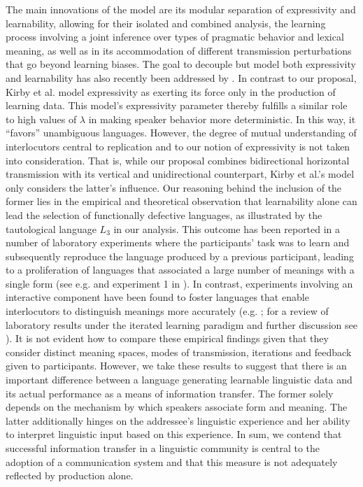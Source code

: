 \documentclass[a4paper]{article}
\begin{document}
The main innovations of the model are its modular separation of expressivity and learnability, allowing for their isolated and combined analysis, the learning process involving a joint inference over types of pragmatic behavior and lexical meaning, as well as in its accommodation of different transmission perturbations that go beyond learning biases. The goal to decouple but model both expressivity and learnability has also recently been addressed by \citet{kirby+etal:2015}. In contrast to our proposal, Kirby et al. model expressivity as exerting its force only in the production of learning data. This model's expressivity parameter thereby fulfills a similar role  to high values of $\lambda$ in making speaker behavior more deterministic. In this way, it ``favors'' unambiguous languages. However, the degree of mutual understanding of interlocutors central to replication and to our notion of expressivity is not taken into consideration. That is, while our proposal combines bidirectional horizontal transmission with its vertical and unidirectional counterpart, Kirby et al.'s model only considers the latter's influence. Our reasoning behind the inclusion of the former lies in the empirical and theoretical observation that learnability alone can lead the selection of functionally defective languages, as illustrated by the tautological language $L_3$ in our analysis. This outcome has been reported in a number of laboratory experiments where the participants' task was to learn and subsequently reproduce the language produced by a previous participant, leading to a proliferation of languages that associated a large number of meanings with a single form (see e.g. \citealt{silvey+etal:2014} and experiment 1 in \citealt{kirby+etal:2008}). In contrast, experiments involving an interactive component have been found to foster languages that enable interlocutors to distinguish meanings more accurately  (e.g. \citealt{fay+etal:2013}; for a review of laboratory results under the iterated learning paradigm and further discussion see \citealt{kirby+etal:2015, tamariz+kirby:2016}). It is not evident how to compare these empirical findings given that they consider distinct meaning spaces, modes of transmission, iterations and feedback given to participants. However, we take these results to suggest that there is an important difference between a language generating learnable linguistic data and its actual performance as a means of information transfer. The former solely depends on the mechanism by which speakers associate form and meaning. The latter additionally hinges on the addressee's linguistic experience and her ability to interpret linguistic input based on this experience. In sum, we contend that successful information transfer in a linguistic community is central to the adoption of a communication system and that this measure is not adequately reflected by production alone.
\end{document}
